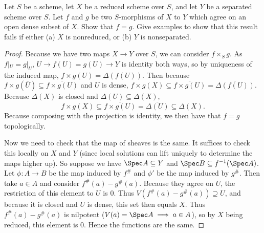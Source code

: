 \begin{exercise}
	Let $S $ be a scheme, let $X$ be a reduced scheme over $S$, and let $Y$ be a separated scheme over $S$. Let $f$ and $g $ be two $S$-morphisms of $X$ to $Y$ which agree on an open dense subset of $X$. Show that $f = g$. Give examples to show that this result fails if either (a) $X$ is nonreduced, or (b) $Y$ is nonseparated.
	\fi
\end{exercise}
\begin{proof}
	Because we have two maps $X\to Y $ over $S $, we can consider $f \times_S g $.
	As $f|_U = g|_U $, $U \to f(U) = g(U) \to Y $ is identity both ways, so by uniqueness of the induced map, $f\times g(U) = \Delta(f(U))$.
	Then because $f\times g(\overline{U}) \subseteq \overline{f\times g(U)}   $ and $U $ is dense, $f \times g(X) \subseteq \overline{f \times g(U)}  = \overline{\Delta(f(U))}$.
	Because $\Delta(X) $ is closed and $\Delta(U) \subseteq \Delta(X) $,
	\[
		f \times g(X) \subseteq \overline{f \times g(U)}  = \overline{\Delta(U)} \subseteq \Delta(X)
	.\]
	Because composing with the projection is identity, we then have that $f=g $ topologically.

	Now we need to check that the map of sheaves is the same.
	It suffices to check this locally on $X $ and $Y $ (since local solutions can lift uniquely to determine the maps higher up).
	So suppose we have $\Spec A \subseteq Y$ and $\Spec B \subseteq f^{-1}(\Spec A) $.
	Let $\phi: A\to B $ be the map induced by $f^\# $ and $\phi ' $ be the map induced by $g^\# $.
	Then take $a\in A $ and consider $f^\#(a) - g^\#(a) $.
	Because they agree on $U $, the restriction of this element to $U$ is $0 $.
	Thus $V(f^\#(a) - g^\#(a)) \supseteq U $, and because it is closed and $U $ is dense, this set then equals $X $.
	Thus $f^\#(a) - g^\#(a) $ is nilpotent ($V(a) = \Spec A \implies a \in A $), so by $X $ being reduced, this element is 0.
	Hence the functions are the same.



\end{proof}
